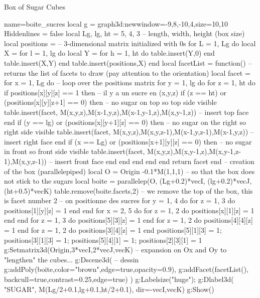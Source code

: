 \begin{demo}{Box of Sugar Cubes}
\begin{luadraw}{name=boite_sucres}
local g = graph3d:new{window={-9,8,-10,4},size={10,10}}
Hiddenlines = false
local Lg, lg, ht = 5, 4, 3 -- length, width, height (box size)
local positions = {} -- 3-dimensional matrix initialized with 0s
for L = 1, Lg do
    local X = {}
    for l = 1, lg do
        local Y = {}
        for h = 1, ht do table.insert(Y,0) end
        table.insert(X,Y)
    end
    table.insert(positions,X)
end
local facetList = function() -- returns the list of facets to draw (pay attention to the orientation)
    local facet = {}
    for x = 1, Lg do -- loop over the positions matrix
        for y = 1, lg do
            for z = 1, ht do
                if positions[x][y][z] == 1 then -- il y a un sucre en (x,y,z)
                    if (z == ht) or (positions[x][y][z+1] == 0) then -- no sugar on top so top side visible
                        table.insert(facet, {M(x,y,z),M(x-1,y,z),M(x-1,y-1,z),M(x,y-1,z)}) -- insert top face
                    end
                    if (y == lg) or (positions[x][y+1][z] == 0) then -- no sugar on the right so right side visible
                        table.insert(facet, {M(x,y,z),M(x,y,z-1),M(x-1,y,z-1),M(x-1,y,z)}) -- insert right face
                    end
                    if (x == Lg) or (positions[x+1][y][z] == 0) then -- no sugar in front so front side visible
                        table.insert(facet, {M(x,y,z),M(x,y-1,z),M(x,y-1,z-1),M(x,y,z-1)}) -- insert front face
                    end
                end
            end
        end
    end
    return facet
end
-- creation of the box (parallelepiped)
local O = Origin -0.1*M(1,1,1) -- so that the box does not stick to the sugars
local boite = parallelep(O, (Lg+0.2)*vecI, (lg+0.2)*vecJ, (ht+0.5)*vecK)
table.remove(boite.facets,2) -- we remove the top of the box, this is facet number 2
-- on positionne des sucres
for y = 1, 4 do for z = 1, 3 do  positions[1][y][z] = 1 end end
for x = 2, 5 do for z = 1, 2 do positions[x][1][z] = 1 end end
for z = 1, 3 do positions[5][3][z] = 1 end
for z = 1, 2 do positions[4][4][z] = 1 end
for z = 1, 2 do positions[3][4][z] = 1 end
positions[5][1][3] = 1; positions[3][1][3] = 1; positions[5][4][1] = 1; positions[2][3][1] = 1
g:Setmatrix3d({Origin,3*vecI,2*vecJ,vecK}) -- expansion on Ox and Oy to "lengthen" the cubes...
g:Dscene3d( -- dessin
    g:addPoly(boite,{color="brown",edge=true,opacity=0.9}),
    g:addFacet(facetList(), {backcull=true,contrast=0.25,edge=true})    )
g:Labelsize("huge"); g:Dlabel3d( "SUGAR", M(Lg/2+0.1,lg+0.1,ht/2+0.1), {dir={-vecI,vecK}})
g:Show()
\end{luadraw}
\end{demo}

